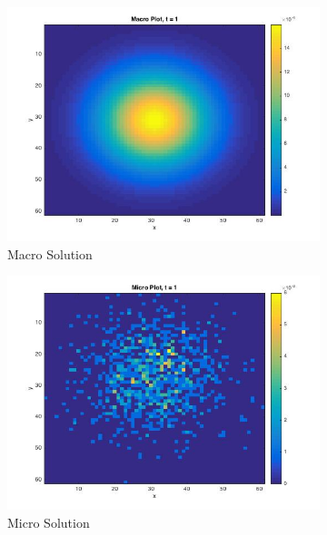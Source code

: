 \documentclass[10pt]{article}
\begin{document}
\begin{figure}
\begin{subfigure}{.45\linewidth}
\centering
\includegraphics[scale = .45]{MacroPlot.jpg}
\caption{Macro Solution}
\label{fig:macroPlot}
\end{subfigure}%
\begin{subfigure}{.45\linewidth}
\centering
\includegraphics[scale = .45]{MicroPlot.jpg}
\caption{Micro Solution}
\label{fig:microPlot}
\end{subfigure}\\[1ex]
\begin{subfigure}{\linewidth}
\centering

\end{subfigure}
\end{figure}
\end{document}
